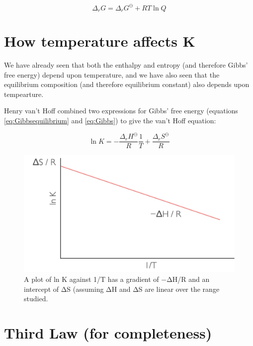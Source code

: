 \documentclass[
]{book}
\begin{document}
\begin{equation}
\Delta _r G = \Delta _r G ^ \ominus + RT \ln Q
\label{eq:gibbsquotient}
\end{equation}

\hypertarget{sec:tempK}{%
\section{How temperature affects K}\label{sec:tempK}}

We have already seen that both the enthalpy and entropy (and therefore Gibbs' free energy) depend upon temperature, and we have also seen that the equilibrium composition (and therefore equilibrium constant) also depends upon tempearture.

Henry van't Hoff combined two expressions for Gibbs' free energy (equations \eqref{eq:Gibbsequilibrium} and \eqref{eq:Gibbs}) to give the van't Hoff equation:

\begin{equation}
\ln K = -\frac{\Delta_r H^\ominus }{R}\frac{1}{T}+ \frac{\Delta_r S^\ominus }{R}
\label{eq:vanthoff}
\end{equation}

\begin{figure}

{\centering \includegraphics[width=1\linewidth]{images/vanthoff} 

}

\caption{A plot of ln K against 1/T  has a gradient of −ΔH/R and an intercept of ΔS (assuming ΔH and ΔS are linear over the range studied.}\label{fig:vanthoff}
\end{figure}

\hypertarget{third-law-for-completeness}{%
\section{Third Law (for completeness)}\label{third-law-for-completeness}}
\end{document}
